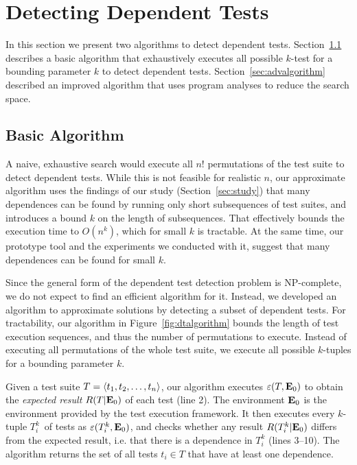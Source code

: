 \section{Detecting Dependent Tests}
\label{sec:detecting}

In this section we present two algorithms to detect dependent
tests. Section~\ref{sec:basic} describes a basic algorithm that
exhaustively executes all possible $k$-test for a bounding parameter $k$
to detect dependent
tests. Section~\ref{sec:advalgorithm} described an improved algorithm
that uses program analyses to reduce the search space.




\subsection{Basic Algorithm}
\label{sec:basic}


A naive, exhaustive search would execute all $n!$
permutations of the test suite to detect dependent tests. While this
is not feasible for realistic $n$, our approximate algorithm uses 
the findings of our study (Section~\ref{sec:study})
that many dependences can be found by running only short subsequences of
test suites, and introduces a bound $k$ on the length
of subsequences. That effectively bounds the execution time to
$O(n^k)$, which for small $k$ is tractable. At the same time, our
prototype tool and the experiments we conducted with it, suggest that
many dependences can be found for small $k$.

\newcommand{\testlist}[0]{\ensuremath{T^k_i}}
\newcommand{\executeTestsInOrder}[1]{\result{#1}{\env_0}}
Since the general form of the dependent test detection problem is
NP-complete, we do not expect to find an efficient algorithm for it.
Instead, we developed an algorithm to approximate solutions by
detecting a subset of dependent
tests. %
For tractability, our algorithm in Figure~\ref{fig:dtalgorithm} bounds the length of
test execution sequences, and thus the number of permutations to
execute. Instead of executing all permutations of the
whole test suite, we execute all possible $k$-tuples for a bounding
parameter $k$.

Given a test suite $T =  \langle t_1, t_2, \ldots, t_n \rangle $, our algorithm
executes $\varepsilon(T,\mathbf{E}_0)$ to obtain the \emph{expected result}
$R(T|\mathbf{E}_0)$ of each test (line 2). The environment $\mathbf{E}_0$
is the environment provided by the test execution framework.
It then executes every $k$-tuple \testlist\ of tests as
$\exec{\testlist}{\env_0}$, and 
checks whether any result $\result{\testlist}{\env_0}$ differs
from the expected result, i.e.
that there is a dependence in $\testlist$
(lines 3--10). The algorithm returns the set of all tests $t_i \in T$
that have at least one dependence.




